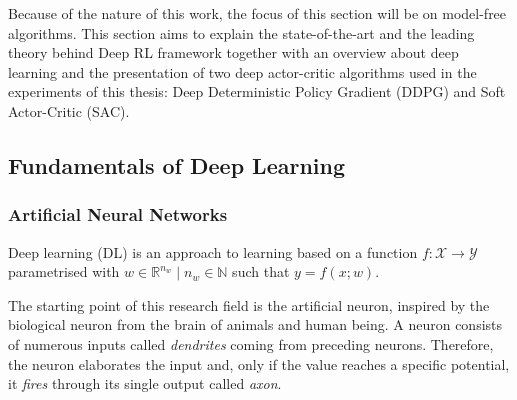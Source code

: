 Because of the nature of this work, the focus of this section will be on model-free algorithms.
This section aims to explain the state-of-the-art and the leading theory behind Deep RL framework together with an overview about deep learning and the presentation of two deep actor-critic algorithms used in the experiments of this thesis: Deep Deterministic Policy Gradient (DDPG) and Soft Actor-Critic (SAC).

\subsection{Fundamentals of Deep Learning}

\subsubsection{Artificial Neural Networks}
Deep learning (DL) is an approach to learning based on a function $f: \mathcal{X} \rightarrow \mathcal{Y}$ parametrised with $w \in \mathbb{R}^{n_w}\;|\;n_w \in \mathbb{N}$ such that $y = f(x;w)$.

The starting point of this research field is the artificial neuron, inspired by the biological neuron from the brain of animals and human being.
A neuron consists of numerous inputs called \textit{dendrites} coming from preceding neurons.
Therefore, the neuron elaborates the input and, only if the value reaches a specific potential, it \textit{fires} through its single output called \textit{axon}.

